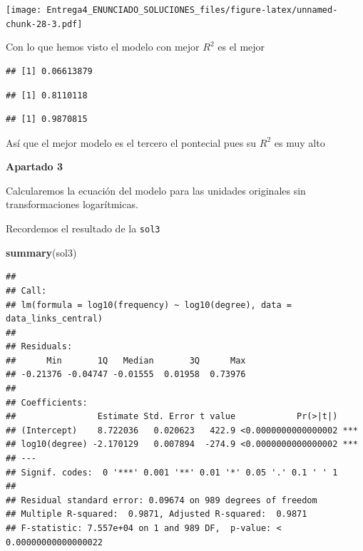 \documentclass[
]{article}
\newenvironment{Shaded}{\begin{snugshade}}{\end{snugshade}}
\newcommand{\KeywordTok}[1]{\textcolor[rgb]{0.13,0.29,0.53}{\textbf{#1}}}
\newcommand{\NormalTok}[1]{#1}
\newcommand{\OperatorTok}[1]{\textcolor[rgb]{0.81,0.36,0.00}{\textbf{#1}}}
\begin{document}
\texttt{[image: Entrega4\_ENUNCIADO\_SOLUCIONES\_files/figure-latex/unnamed-chunk-28-3.pdf]}

Con lo que hemos visto el modelo con mejor \(R^2\) es el mejor

\begin{Shaded}
\end{Shaded}

\begin{verbatim}
## [1] 0.06613879
\end{verbatim}

\begin{Shaded}
\end{Shaded}

\begin{verbatim}
## [1] 0.8110118
\end{verbatim}

\begin{Shaded}
\end{Shaded}

\begin{verbatim}
## [1] 0.9870815
\end{verbatim}

Así que el mejor modelo es el tercero el pontecial pues su \(R^2\) es
muy alto

\textbf{Apartado 3}

Calcularemos la ecuación del modelo para las unidades originales sin
transformaciones logarítmicas.

Recordemos el resultado de la \texttt{sol3}

\begin{Shaded}
\begin{Highlighting}[]
\KeywordTok{summary}\NormalTok{(sol3)}
\end{Highlighting}
\end{Shaded}

\begin{verbatim}
## 
## Call:
## lm(formula = log10(frequency) ~ log10(degree), data = data_links_central)
## 
## Residuals:
##      Min       1Q   Median       3Q      Max 
## -0.21376 -0.04747 -0.01555  0.01958  0.73976 
## 
## Coefficients:
##                Estimate Std. Error t value            Pr(>|t|)    
## (Intercept)    8.722036   0.020623   422.9 <0.0000000000000002 ***
## log10(degree) -2.170129   0.007894  -274.9 <0.0000000000000002 ***
## ---
## Signif. codes:  0 '***' 0.001 '**' 0.01 '*' 0.05 '.' 0.1 ' ' 1
## 
## Residual standard error: 0.09674 on 989 degrees of freedom
## Multiple R-squared:  0.9871, Adjusted R-squared:  0.9871 
## F-statistic: 7.557e+04 on 1 and 989 DF,  p-value: < 0.00000000000000022
\end{verbatim}
\end{document}
